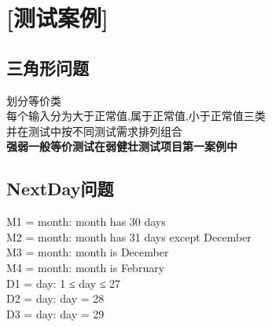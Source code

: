 \documentclass{article}
\newcommand{\blue}{\begin{tabular}{|l|c|c|c|r|}
\hline
  a & b & c & 测试输出 & 预期输出\\
\hline

  

\end{tabular}}
\newcommand{\bluetitle}{三角形弱健壮测试数据1}
\begin{document}
\section{[测试案例]}
\subsection{三角形问题}

划分等价类\\

每个输入分为大于正常值,属于正常值,小于正常值三类\\

并在测试中按不同测试需求排列组合\\

\textbf{\*强弱一般等价测试在弱健壮测试项目第一案例中}

\begin{center}

\renewcommand{\blue}{\begin{tabular}{|l|c|c|c|r|}
  \hline
  y & m & d & 测试输出 & 预期输出\\
  \hline

  

\end{tabular}}

\renewcommand{\bluetitle}{三角形强健壮测试数据2}



\end{center}
\subsection{NextDay问题}

M1 = {month: month has 30 days}\\

M2 = {month: month has 31 days except December}\\

M3 = {month: month is December}\\

M4 = {month: month is February}\\

D1 = {day: 1 ≤ day ≤ 27}\\

D2 = {day: day = 28}\\

D3 = {day: day = 29}\\
\end{document}
